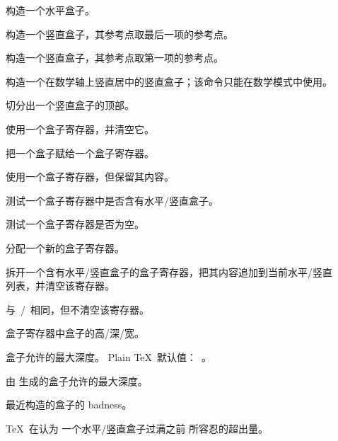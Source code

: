 \documentclass[a4paper]{rapport3}
\newenvironment{inventory}{\begin{description}}{\end{description}}
\begin{document}
\begin{inventory}
\item [] 
      构造一个水平盒子。
\item []
      构造一个竖直盒子，其参考点取最后一项的参考点。
\item []
      构造一个竖直盒子，其参考点取第一项的参考点。
\item []
      构造一个在数学轴上竖直居中的竖直盒子；该命令只能在数学模式中使用。

\item []
      切分出一个竖直盒子的顶部。

\item []
      使用一个盒子寄存器，并清空它。

\item []
      把一个盒子赋给一个盒子寄存器。

\item []
      使用一个盒子寄存器，但保留其内容。

\item []
\mdqon
      测试一个盒子寄存器中是否含有水平/竖直盒子。
\mdqoff

\item []
      测试一个盒子寄存器是否为空。


\item []
      分配一个新的盒子寄存器。

\item []
      拆开一个含有水平/竖直盒子的盒子寄存器，把其内容追加到当前水平/竖直列表，并清空该寄存器。

\item []
      与 $\,$/$\,$ 相同，但不清空该寄存器。

\item []
      盒子寄存器中盒子的高/深/宽。

\item []
      盒子允许的最大深度。
      Plain \TeX\ 默认值：~。

\item []
      由  生成的盒子允许的最大深度。

\item []
      最近构造的盒子的 badness。

\item []
      \TeX\ 在认为
\mdqon
      一个水平/竖直盒子过满之前
\mdqoff
所容忍的超出量。


\end{inventory}
\end{document}
